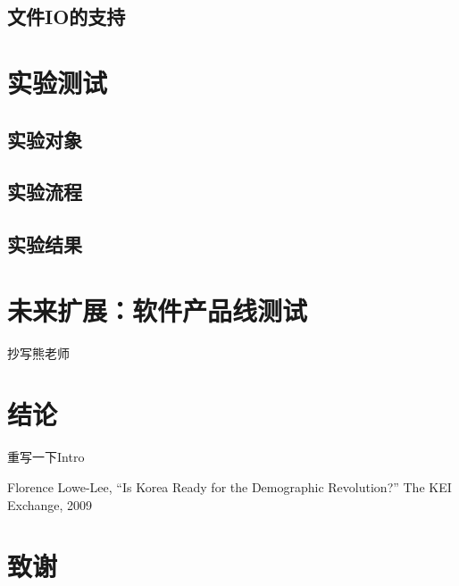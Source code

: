 \documentclass[nofonts]{ctexrep}
\begin{document}
\section{文件IO的支持}

\chapter{实验测试}
\section{实验对象}
\section{实验流程}
\section{实验结果}

\chapter{未来扩展：软件产品线测试}
抄写熊老师

\chapter{结论}
重写一下Intro



%
\begin{thebibliography}{99}
Florence Lowe-Lee, 
``Is Korea Ready for the Demographic Revolution?''
\newblock The KEI Exchange, 2009

\end{thebibliography}
\chapter*{致谢}
\end{document}
